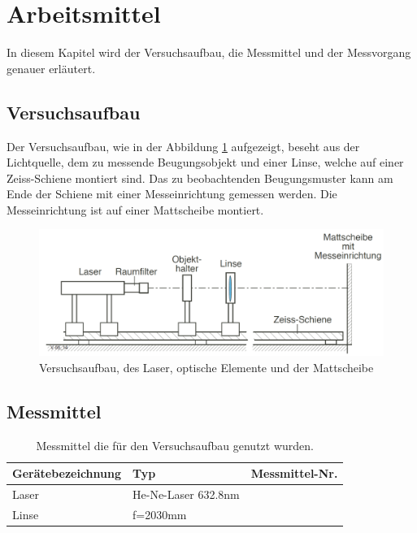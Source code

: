 \section{Arbeitsmittel}
In diesem Kapitel wird der Versuchsaufbau, die Messmittel und der Messvorgang genauer erläutert.

\subsection{Versuchsaufbau}
Der Versuchsaufbau, wie in der Abbildung \ref{fig:Versuchsaufbau} aufgezeigt, beseht aus der Lichtquelle, dem zu messende Beugungsobjekt und einer Linse, welche auf einer Zeiss-Schiene montiert sind. Das zu beobachtenden Beugungsmuster kann am Ende der Schiene mit einer Messeinrichtung gemessen werden. Die Messeinrichtung ist auf einer Mattscheibe montiert.

\begin{figure}[h!]
	\centering
	\includegraphics[width=\textwidth]{data/versuchsaufbau}
	\caption{Versuchsaufbau, des Laser, optische Elemente und der Mattscheibe}
	\label{fig:Versuchsaufbau}
\end{figure}

\subsection{Messmittel}

\begin{table}[h!]
	\centering
	\begin{tabular}{|l|l|l|}
		\hline
		\rowcolor[rgb]{0.89,0.89,0.89}
		\textbf{Gerätebezeichnung} & \textbf{Typ}        & \textbf{Messmittel-Nr.} \\ \hline
		Laser                      & He-Ne-Laser 632.8nm &                         \\ \hline
		Linse                      & f=2030mm            &                         \\ \hline
	\end{tabular}
\caption{Messmittel die für den Versuchsaufbau genutzt wurden.}
\label{Messmittel}
\end{table}


